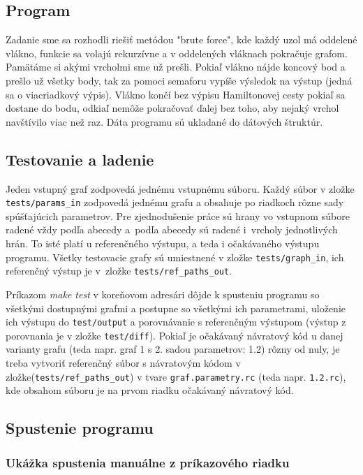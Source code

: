 \documentclass[a4paper,11pt, titlepage]{article}
\begin{document}
\subsection{Program}

Zadanie sme sa rozhodli riešiť metódou "brute force", kde každý uzol má oddelené vlákno, funkcie sa volajú rekurzívne a v oddelených vláknach pokračuje grafom. Pamätáme si akými vrcholmi sme už prešli. Pokiaľ vlákno nájde koncový bod a prešlo už všetky body, tak za pomoci semaforu vypíše výsledok na výstup (jedná sa o viacriadkový výpis). Vlákno končí bez výpisu Hamiltonovej cesty pokiaľ sa dostane do bodu, odkiaľ nemôže pokračovať ďalej bez toho, aby nejaký vrchol navštívilo viac než raz. Dáta programu sú ukladané do dátových štruktúr.

\subsection{Testovanie a ladenie} 

Jeden vstupný graf zodpovedá jednému vstupnému súboru. Každý súbor v zložke \texttt{tests/params\_in} zodpovedá jednému grafu a obsahuje po riadkoch rôzne sady spúšťajúcich parametrov. Pre zjednodušenie práce sú hrany vo vstupnom súbore radené vždy podľa abecedy a~podľa abecedy sú radené i~vrcholy jednotlivých hrán. To isté platí u referenčného výstupu, a teda i očakávaného výstupu programu. Všetky testovacie grafy sú umiestnené v zložke \texttt{tests/graph\_in}, ich referenčný výstup je v~zložke \texttt{tests/ref\_paths\_out}. 

\par
Príkazom \emph{make test} v koreňovom adresári dôjde k spusteniu programu so všetkými dostupnými grafmi a postupne so všetkými ich parametrami, uloženie ich výstupu do \texttt{test/output} a porovnávanie s referenčným výstupom (výstup z porovnania je v zložke \texttt{test/diff}). Pokiaľ je očakávaný návratový kód u danej varianty grafu (teda napr. graf 1 s 2. sadou parametrov: 1.2) rôzny od nuly, je treba vytvoriť referenčný súbor s návratovým kódom v zložke(\texttt{tests/ref\_paths\_out}) v tvare \texttt{graf.parametry.rc} (teda napr. \texttt{1.2.rc}), kde obsahom súboru je na prvom riadku očakávaný návratový kód.

\subsection{Spustenie programu}

\subsubsection{Ukážka spustenia manuálne z príkazového riadku}
\end{document}
